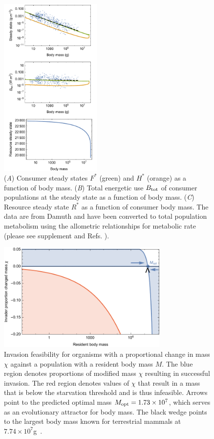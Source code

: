 \documentclass{pnastwo}
\begin{document}
\begin{figure}
\centering
\includegraphics[width=0.45\textwidth]{fig_FPAllometric.pdf}
\caption{ (\emph{A}) Consumer steady states $F^*$ (green) and $H^*$ (orange) as a function of
  body mass.
  (\emph{B}) Total energetic use $B_{\rm tot}$ of consumer populations at the steady state as a function of body mass.
  (\emph{C}) Resource steady state $R^*$ as a function of consumer body mass. The data are from Damuth \cite{damuth1987interspecific} and have been converted to total population metabolism using the allometric relationships for metabolic rate (please see supplement and Refs. \cite{West:2001bv,hou,moses2008rmo}).}
\label{fig:mass}
\end{figure}

\begin{figure}
\centering
\includegraphics[width=0.75\textwidth]{fig_Invasion.pdf}
\caption{ Invasion feasibility for organisms with a proportional change in
  mass $\chi$ against a population with a resident body mass $M$.  The blue
  region denotes proportions of modified mass $\chi$ resulting in successful invasion.  The
  red region denotes values of $\chi$ that result in a mass that is below the
  starvation threshold and is thus infeasible.
  Arrows point to the predicted optimal mass $M_{\rm opt}=1.73\times 10^7$, which serves as an evolutionary attractor for body mass.
  The black wedge points to the largest body mass known for terrestrial mammals at $7.74\times10^7$g~\cite{Smith:2010p3442}.}
\label{fig:invasion}
\end{figure}
\end{document}

